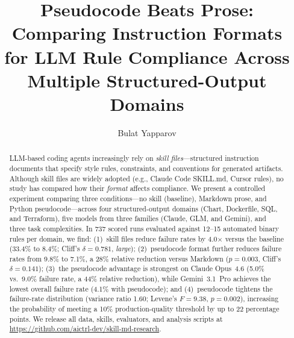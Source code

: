 \documentclass[sigconf,nonacm]{acmart}
\begin{document}
\title{Pseudocode Beats Prose: Comparing Instruction Formats\\for LLM Rule Compliance Across Multiple Structured-Output Domains}

\author{Bulat Yapparov}


\begin{abstract}
LLM-based coding agents increasingly rely on \emph{skill files}---structured
instruction documents that specify style rules, constraints, and conventions
for generated artifacts. Although skill files are widely adopted (e.g., Claude
Code SKILL.md, Cursor rules), no study has compared how their \emph{format}
affects compliance. We present a controlled experiment comparing three
conditions---no skill (baseline), Markdown prose, and Python
pseudocode---across four structured-output domains (Chart, Dockerfile,
SQL, and Terraform), five models from three families (Claude, GLM, and
Gemini), and three
task complexities. In 737 scored runs evaluated against 12--15 automated binary
rules per domain, we find: (1)~skill files reduce failure rates by 4.0$\times$
versus the baseline (33.4\% to 8.4\%; Cliff's $\delta = 0.781$, \emph{large});
(2)~pseudocode format further reduces failure rates from 9.8\% to 7.1\%, a
28\% relative reduction versus Markdown ($p = 0.003$, Cliff's $\delta = 0.141$);
(3)~the pseudocode advantage is strongest on Claude Opus~4.6
(5.0\% vs.\ 9.0\% failure rate, a 44\% relative reduction), while
Gemini~3.1~Pro achieves the lowest overall failure rate (4.1\% with
pseudocode); and (4)~pseudocode tightens
the failure-rate distribution (variance ratio 1.60; Levene's $F = 9.38$,
$p = 0.002$), increasing the probability of meeting a 10\% production-quality
threshold by up to 22 percentage points. We release all data, skills, evaluators, and
analysis scripts at
\url{https://github.com/aictrl-dev/skill-md-research}.
\end{abstract}

\maketitle

\end{document}
